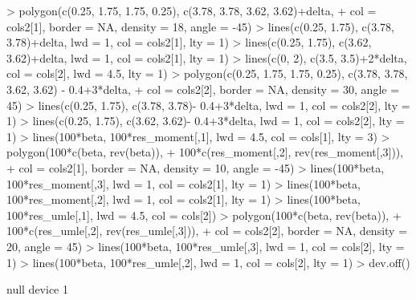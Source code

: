 \documentclass{article}
\begin{document}
\begin{Schunk}
\begin{Sinput}
> polygon(c(0.25, 1.75, 1.75, 0.25), c(3.78, 3.78, 3.62, 3.62)+delta,
+         col = cols2[1], border = NA, density = 18, angle = -45)
> lines(c(0.25, 1.75), c(3.78, 3.78)+delta, lwd = 1, col = cols2[1], lty = 1)
> lines(c(0.25, 1.75), c(3.62, 3.62)+delta, lwd = 1, col = cols2[1], lty = 1)
> lines(c(0, 2), c(3.5, 3.5)+2*delta, col = cols[2], lwd = 4.5, lty = 1)
> polygon(c(0.25, 1.75, 1.75, 0.25), c(3.78, 3.78, 3.62, 3.62) - 0.4+3*delta,
+         col = cols2[2], border = NA, density = 30, angle = 45)
> lines(c(0.25, 1.75), c(3.78, 3.78)- 0.4+3*delta, lwd = 1, col = cols2[2], lty = 1)
> lines(c(0.25, 1.75), c(3.62, 3.62)- 0.4+3*delta, lwd = 1, col = cols2[2], lty = 1)
> lines(100*beta, 100*res_moment[,1], lwd = 4.5, col = cols[1], lty = 3)
> polygon(100*c(beta, rev(beta)),
+         100*c(res_moment[,2], rev(res_moment[,3])),
+         col = cols2[1], border = NA, density = 10, angle = -45)
> lines(100*beta, 100*res_moment[,3], lwd = 1, col = cols2[1], lty = 1)
> lines(100*beta, 100*res_moment[,2], lwd = 1, col = cols2[1], lty = 1)
> lines(100*beta, 100*res_umle[,1], lwd = 4.5, col = cols[2])
> polygon(100*c(beta, rev(beta)),
+         100*c(res_umle[,2], rev(res_umle[,3])),
+         col = cols2[2], border = NA, density = 20, angle = 45)
> lines(100*beta, 100*res_umle[,3], lwd = 1, col = cols[2], lty = 1)
> lines(100*beta, 100*res_umle[,2], lwd = 1, col = cols[2], lty = 1)
> dev.off()
\end{Sinput}
\begin{Soutput}
null device 
          1 
\end{Soutput}
\end{Schunk}

\begin{figure}

\end{figure}

\begin{figure}

\end{figure}
\end{document}
